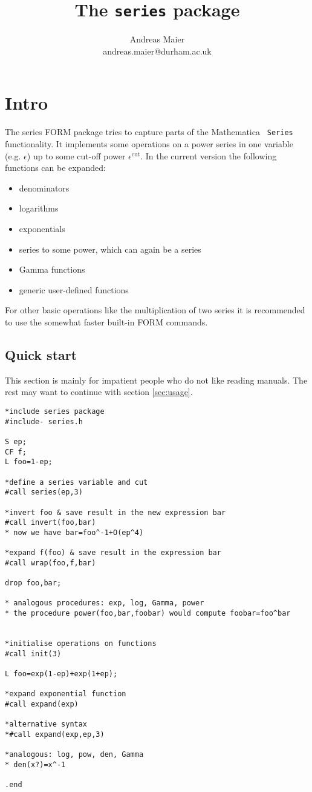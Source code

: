 \documentclass[titlepage]{article}
\begin{document}
\title{The \texttt{series} package}
\author{Andreas Maier\\andreas.maier@durham.ac.uk}
\maketitle

\tableofcontents

\section{Intro}

The series FORM package tries to capture parts of the Mathematica {\tt
  Series} functionality. It implements some operations on a power
series in one variable
(e.g. $\epsilon$) up to some cut-off power $\epsilon^{\text{cut}}$. In
the current version the following functions can be expanded:
\begin{itemize}
\item denominators
\item logarithms
\item exponentials
\item series to some power, which can again be a series
\item Gamma functions
\item generic user-defined functions
\end{itemize}
For other basic operations like the multiplication of two series it
is recommended to use the somewhat faster built-in FORM commands.

\subsection{Quick start}
\label{sec:quick}

This section is mainly for impatient people who do not like reading
manuals. The rest may want to continue with section \ref{sec:usage}.

\begin{verbatim}
*include series package
#include- series.h

S ep;
CF f;
L foo=1-ep;

*define a series variable and cut
#call series(ep,3)

*invert foo & save result in the new expression bar
#call invert(foo,bar)
* now we have bar=foo^-1+O(ep^4)

*expand f(foo) & save result in the expression bar
#call wrap(foo,f,bar)

drop foo,bar;

* analogous procedures: exp, log, Gamma, power
* the procedure power(foo,bar,foobar) would compute foobar=foo^bar


*initialise operations on functions
#call init(3)

L foo=exp(1-ep)+exp(1+ep);

*expand exponential function
#call expand(exp)

*alternative syntax
*#call expand(exp,ep,3)

*analogous: log, pow, den, Gamma
* den(x?)=x^-1

.end
\end{verbatim}
\end{document}
